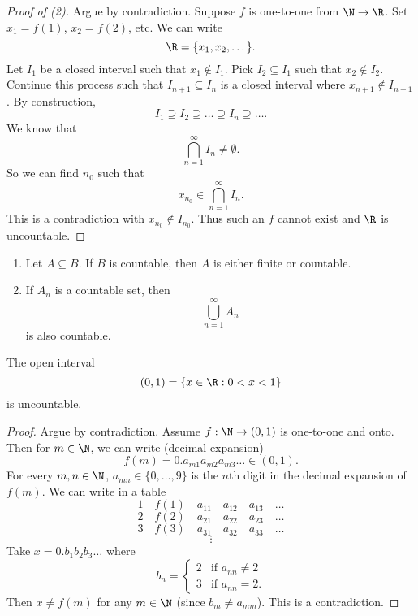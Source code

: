 \begin{proof}[Proof of (2)]
  Argue by contradiction. Suppose $f$ is one-to-one from
  $\N \to \R$.
  Set $x_1 = f(1)$, $x_2 = f(2)$, etc. We can write
  \[\R = \{x_1, x_2, \dots\}.\]
  Let $I_1$ be a closed interval such that
  $x_1 \notin I_1$. Pick $I_2 \subseteq I_1$ such that
  $x_2 \notin I_2$. Continue this process such that
  $I_{n+1} \subseteq I_n$ is a closed interval where
  $x_{n+1} \notin I_{n+1}$.
  By construction,
  \[I_1 \supseteq I_2 \supseteq \dots \supseteq I_n \supseteq \dots.\]
  We know that
  \[\bigcap_{n = 1}^\infty I_n \ne \emptyset.\]
  So we can find $n_0$ such that
  \[x_{n_0} \in \bigcap_{n = 1}^\infty I_n.\]
  This is a contradiction with $x_{n_0} \notin I_{n_0}$.
  Thus such an $f$ cannot exist and $\R$ is
  uncountable.
\end{proof}

\begin{theorem}\leavevmode
  \begin{enumerate}
    \item Let $A \subseteq B$. If $B$ is countable, then
      $A$ is either finite or countable.
    \item If $A_n$ is a countable set, then
      \[\bigcup_{n=1}^\infty A_n\]
      is also countable.
  \end{enumerate}
\end{theorem}

\begin{theorem}
  The open interval
  \[(0, 1) = \{x \in \R : 0 < x < 1\}\]
  is uncountable.
\end{theorem}

\begin{proof}
  Argue by contradiction. Assume $f : \N \to (0, 1)$
  is one-to-one and onto. Then for $m \in \N$,
  we can write (decimal expansion)
  \[f(m) = 0.a_{m1}a_{m2}a_{m3}\ldots \in (0, 1).\]
  For every $m, n \in \N$, $a_{mn} \in \{0, \dots, 9\}$
  is the $n$th digit in the decimal expansion of
  $f(m)$. We can write in a table
  \[1 \quad f(1) \quad a_{11} \quad a_{12} \quad a_{13} \quad \dots\]
  \[2 \quad f(2) \quad a_{21} \quad a_{22} \quad a_{23} \quad \dots\]
  \[3 \quad f(3) \quad a_{31} \quad a_{32} \quad a_{33} \quad \dots\]
  \[\vdots\]
  Take $x = 0.b_1b_2b_3\ldots$ where
  \[
    b_n =
    \begin{cases}
      2 & \text{if $a_{nn} \ne 2$} \\
      3 & \text{if $a_{nn} = 2$}.
    \end{cases}
  \]
  Then $x \ne f(m)$ for any $m \in \N$
  (since $b_m \ne a_{mm}$). This is a
  contradiction.
\end{proof}
